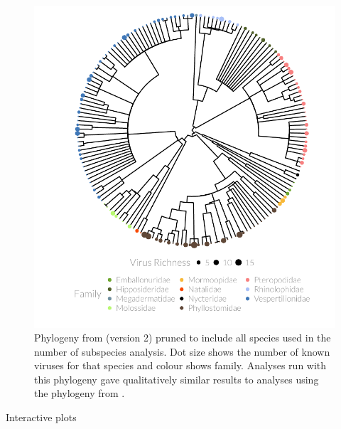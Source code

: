 \begin{knitrout}\footnotesize
{}\color{fgcolor}\begin{figure}[t]

{\centering \includegraphics[width=1\textwidth,trim = 0cm 0cm 0cm 0cm]{figure/A-treePlot2-1} 

}

\caption[Pruned alternative phylogeny with dot size showing number of pathogens and colour showing family.]{
Phylogeny from \textcite{jones2005bats} (version 2) pruned to include all species used in the number of subspecies analysis.
Dot size shows the number of known viruses for that species and colour shows family.
Analyses run with this phylogeny gave qualitatively similar results to analyses using the phylogeny from \cite{bininda2007delayed}.
}\label{fig:treePlot2}
\end{figure}


\end{knitrout}






Interactive plots







 		






